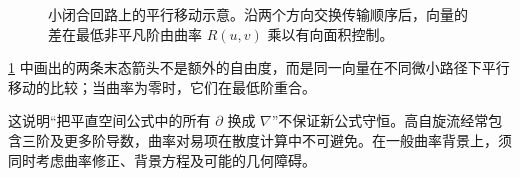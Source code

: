 \begin{figure}[htbp]
\centering

\caption{小闭合回路上的平行移动示意。沿两个方向交换传输顺序后，向量的差在最低非平凡阶由曲率 $R(u,v)$ 乘以有向面积控制。}\label{fig:ghs-curvature-holonomy}
\end{figure}

\cref{fig:ghs-curvature-holonomy} 中画出的两条末态箭头不是额外的自由度，而是同一向量在不同微小路径下平行移动的比较；当曲率为零时，它们在最低阶重合。

这说明“把平直空间公式中的所有 $\partial$ 换成 $\nabla$”不保证新公式守恒。高自旋流经常包含三阶及更多阶导数，曲率对易项在散度计算中不可避免。在一般曲率背景上，须同时考虑曲率修正、背景方程及可能的几何障碍。
